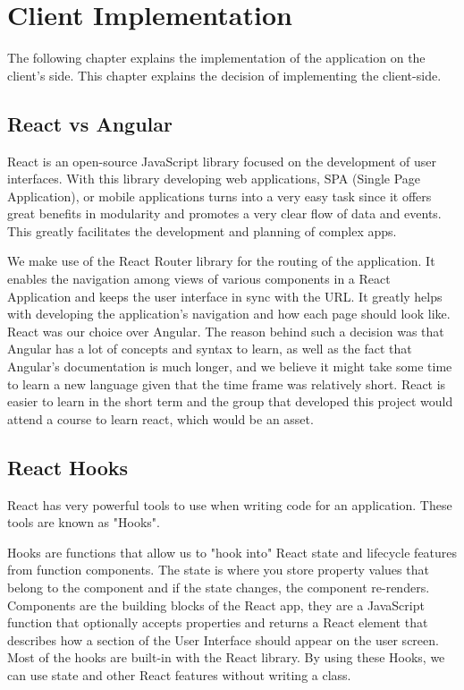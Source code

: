 \documentclass[a4paper,twoside,10pt]{report}
\begin{document}
\chapter{Client Implementation}
The following chapter explains the implementation of the application on the client’s side. This chapter explains the decision of implementing the client-side. 
 
\section{React vs Angular}

React is an open-source JavaScript library focused on the development of user interfaces. With this library developing web applications, SPA (Single Page Application), or mobile applications turns into a very easy task since it offers great benefits in modularity and promotes a very clear flow of data and events. This greatly facilitates the development and planning of complex apps.

We make use of the React Router library for the routing of the application. It enables the navigation among views of various components in a React Application and keeps the user interface in sync with the URL. It greatly helps with developing the application's navigation and how each page should look like.
React was our choice over Angular. The reason behind such a decision was that Angular has a lot of concepts and syntax to learn, as well as the fact that Angular's documentation is much longer, and we believe it might take some time to learn a new language given that the time frame was relatively short. React is easier to learn in the short term and the group that developed this project would attend a course to learn react, which would be an asset.

\section{React Hooks}
React has very powerful tools to use when writing code for an application. These tools are known as "Hooks".

Hooks are functions that allow us to "hook into" React state and lifecycle features from function components. The state is where you store property values that belong to the component and if the state changes, the component re-renders. Components are the building blocks of the React app, they are a JavaScript function that optionally accepts properties and returns a React element that describes how a section of the User Interface should appear on the user screen.  
Most of the hooks are built-in with the React library. By using these Hooks, we can use state and other React features without writing a class.
\end{document}
